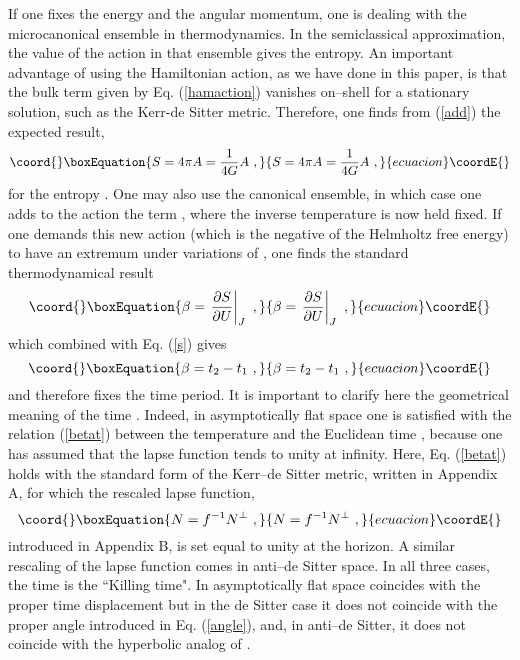 \documentclass[a4paper,preprintnumbers,amsmath,amssymb]{revtex4}
\begin{document}
If one fixes the energy and the angular momentum, one is dealing with the microcanonical
ensemble in thermodynamics. In the semiclassical approximation, the value of the
action in that ensemble gives the entropy. An important advantage of using the Hamiltonian action,
as we have done in this paper, is that the bulk term given by Eq. (\ref{hamaction})
vanishes on--shell for a stationary solution, such as the Kerr-de Sitter metric.
Therefore, one finds from (\ref{add}) the expected result,
\begin{equation}\coord{}\boxEquation{
S=4\pi A = \frac{1}{4G} A \ ,
\label{entropy}
}{
S=4\pi A = \frac{1}{4G} A \ ,
}{ecuacion}\coordE{}\end{equation}
for the entropy \coordHE{}.
One may also use the canonical ensemble, in which case one adds to the action the term
\coordHE{}, where the inverse temperature \myHighlight{$\beta$}\coordHE{} is now held fixed. If one demands this
new action (which is the negative of the Helmholtz free energy) to have an extremum under
variations of \coordHE{}, one finds the standard thermodynamical result
\begin{equation}\coord{}\boxEquation{
\beta=\left.\frac{\partial S}{\partial U}\right|_J \ ,
\label{beta}
}{
\beta=\left.\frac{\partial S}{\partial U}\right|_J \ ,
}{ecuacion}\coordE{}\end{equation}
which combined with Eq. (\ref{s}) gives
\begin{equation}\coord{}\boxEquation{
\beta=t_2-t_1  \ ,
\label{betat}
}{
\beta=t_2-t_1  \ ,
}{ecuacion}\coordE{}\end{equation}
and therefore fixes the time period. It is important to
clarify here the geometrical meaning of the time \coordHE{}. Indeed, in asymptotically
flat space one is satisfied with the relation (\ref{betat}) between the temperature and the
Euclidean time \coordHE{}, because one has assumed that the lapse function \coordHE{} tends to
unity at infinity. Here, Eq. (\ref{betat}) holds with the standard form of the Kerr--de Sitter metric,
written in Appendix A, for which the rescaled lapse function,
\begin{equation}\coord{}\boxEquation{
N=f^{-1} N^{\perp} \ ,
\label{resclapse}
}{
N=f^{-1} N^{\perp} \ ,
}{ecuacion}\coordE{}\end{equation}
introduced in Appendix B, is set equal to unity at the horizon. A similar rescaling
of the lapse function comes in anti--de Sitter space. In all three cases, the time \coordHE{}
is the ``Killing time". In asymptotically flat space \coordHE{} coincides with the proper time displacement but
in the de Sitter case it does not coincide with the proper angle \myHighlight{$\Theta$}\coordHE{} introduced in Eq. (\ref{angle}),
 and, in anti--de Sitter,  it does not coincide with the hyperbolic analog of \myHighlight{$\Theta$}\coordHE{}.
\end{document}

